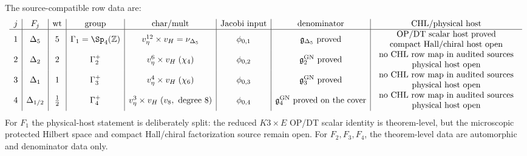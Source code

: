 \begin{theorem}
\label{thm:f1-f4-pinned-host-table}
The source-compatible row data are:
\[
\begin{array}{c|c|c|c|c|c|c|c}
j&F_j&\mathrm{wt}&\mathrm{group}&\mathrm{char/mult}&
\mathrm{Jacobi\ input}&\mathrm{denominator}&
\mathrm{CHL/physical\ host}\\ \hline
1&\Delta_5&5&\Gamma_1=\Sp_4(\mathbb Z)&
v_\eta^{12}\times v_H=\nu_{\Delta_5}&
\phi_{0,1}&
\mathfrak g_{\Delta_5}\ \mathrm{proved}&
\begin{array}{c}
\mathrm{OP/DT\ scalar\ host\ proved}\\
\mathrm{compact\ Hall/chiral\ host\ open}
\end{array}\\
2&\Delta_2&2&\Gamma_2^+&
v_\eta^{6}\times v_H\;(\chi_4)&
\phi_{0,2}&
\mathfrak g^{\mathrm{GN}}_2\ \mathrm{proved}&
\begin{array}{c}
\mathrm{no\ CHL\ row\ map\ in\ audited\ sources}\\
\mathrm{physical\ host\ open}
\end{array}\\
3&\Delta_1&1&\Gamma_3^+&
v_\eta^{4}\times v_H\;(\chi_6)&
\phi_{0,3}&
\mathfrak g^{\mathrm{GN}}_3\ \mathrm{proved}&
\begin{array}{c}
\mathrm{no\ CHL\ row\ map\ in\ audited\ sources}\\
\mathrm{physical\ host\ open}
\end{array}\\
4&\Delta_{1/2}&\frac12&\Gamma_4^+&
v_\eta^{3}\times v_H\;(v_8,\ \mathrm{degree}\ 8)&
\phi_{0,4}&
\mathfrak g^{\mathrm{GN}}_4\ \mathrm{proved\ on\ the\ cover}&
\begin{array}{c}
\mathrm{no\ CHL\ row\ map\ in\ audited\ sources}\\
\mathrm{physical\ host\ open}
\end{array}
\end{array}
\]
For \(F_1\) the physical-host statement is deliberately split:
the reduced \(K3\times E\) OP/DT scalar identity is theorem-level, but
the microscopic protected Hilbert space and compact Hall/chiral
factorization source remain open.  For \(F_2,F_3,F_4\), the theorem-level
data are automorphic and denominator data only.
\end{theorem}

